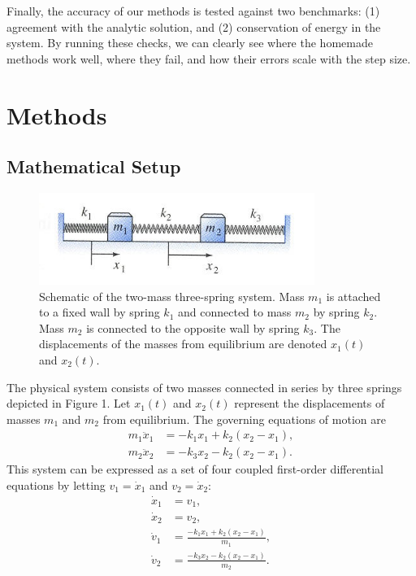 \documentclass[12pt]{article}
\begin{document}
Finally, the accuracy of our methods is tested against two benchmarks: (1) agreement with the analytic solution, and (2) conservation of energy in the system. By running these checks, we can clearly see where the homemade methods work well, where they fail, and how their errors scale with the step size.

\section{Methods}

\subsection{Mathematical Setup}

\begin{figure}[h!]
    \centering
    \includegraphics[width=0.8\textwidth]{2mass3spring.jpg}
    \caption{Schematic of the two-mass three-spring system. Mass $m_1$ is attached to a fixed wall by spring $k_1$ and connected to mass $m_2$ by spring $k_2$. 
    Mass $m_2$ is connected to the opposite wall by spring $k_3$. The displacements of the masses from equilibrium are denoted $x_1(t)$ and $x_2(t)$.}
    \label{fig:system}
\end{figure}

The physical system consists of two masses connected in series by three springs depicted in Figure 1. 
Let $x_1(t)$ and $x_2(t)$ represent the displacements of masses $m_1$ and $m_2$ from equilibrium. 
The governing equations of motion are
\begin{align}
    m_1 \ddot{x}_1 &= -k_1 x_1 + k_2 (x_2 - x_1), \\
    m_2 \ddot{x}_2 &= -k_3 x_2 - k_2 (x_2 - x_1).
\end{align}
This system can be expressed as a set of four coupled first-order differential equations by letting 
$v_1 = \dot{x}_1$ and $v_2 = \dot{x}_2$:
\begin{align}
    \dot{x}_1 &= v_1, \\
    \dot{x}_2 &= v_2, \\
    \dot{v}_1 &= \frac{-k_1 x_1 + k_2(x_2 - x_1)}{m_1}, \\
    \dot{v}_2 &= \frac{-k_3 x_2 - k_2(x_2 - x_1)}{m_2}.
\end{align}
\end{document}
